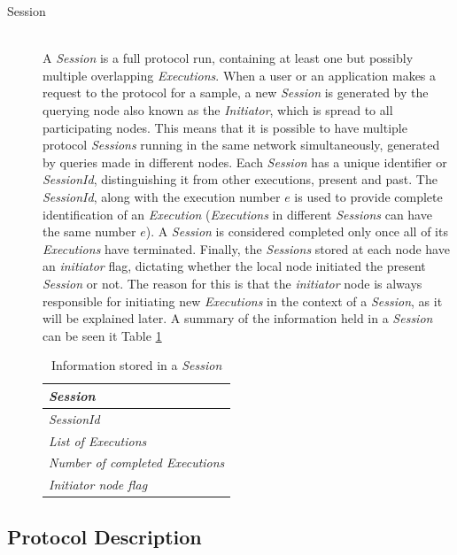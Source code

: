 \documentclass[a4paper,11pt,twoside]{report}
\begin{document}
\begin{description}
   \item[Session] \hfill \\
  A \textit{Session} is a full protocol run, containing at least one but possibly multiple overlapping \textit{Executions}. When a user or an application makes a request to the protocol for a sample, a new \textit{Session} is generated by the querying node also known as the \textit{Initiator}, which is spread to all participating nodes. This means that it is possible to have multiple protocol \textit{Sessions} running in the same network simultaneously, generated by queries made in different nodes. Each \textit{Session} has a unique identifier or \textit{SessionId}, distinguishing it from other executions, present and past. The \textit{SessionId}, along with the execution number $e$ is used to provide complete identification of an \textit{Execution} (\textit{Executions} in different \textit{Sessions} can have the same number $e$). A \textit{Session} is considered completed only once all of its \textit{Executions} have terminated. Finally, the \textit{Sessions} stored at each node have an \textit{initiator} flag, dictating whether the local node initiated the present \textit{Session} or not. The reason for this is that the \textit{initiator} node is always responsible for initiating new \textit{Executions} in the context of a \textit{Session}, as it will be explained later. A summary of the information held in a \textit{Session} can be seen it Table \ref{table:session_fields}
   
   \begin{table}
     \centering
   	\begin{tabular}{|l|}
   	\hline
   \textbf{\textit{Session}}\\
   	\hline
   	\hline
   	 \textit{SessionId}\\
     \textit{List of Executions}\\
     \textit{Number of completed Executions}\\
     \textit{Initiator node flag }\\
       \hline
     	\end{tabular}
     	\caption{Information stored in a \textit{Session}}
     	\label{table:session_fields}
     \end{table}
   
\end{description}

\subsection{Protocol Description}
\label{sec:protocol_description}
\end{document}
